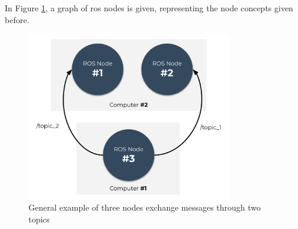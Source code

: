 In Figure \ref{fig:background:ros_nodes}, a graph of \ac{ros} nodes is given, representing the node concepts given before.

\begin{figure}[H]
    \centering
    \includegraphics[width=0.8\textwidth]{background/figures/ros_nodes.pdf}
    \caption{General example of three nodes exchange messages through two topics}
    \label{fig:background:ros_nodes}
\end{figure}


